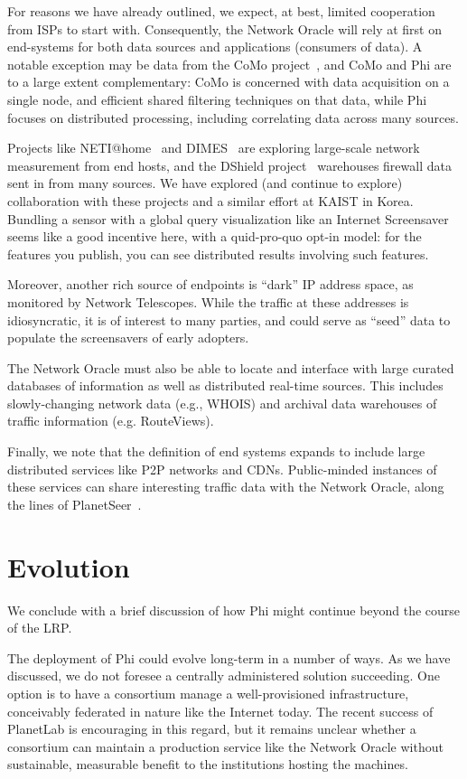 \documentclass[twocolumn,10pt]{article}
\def\Sys{Network Oracle\xspace}
\def\Lrp{Phi\xspace}
\begin{document}
For reasons we have already outlined, we expect, at best, limited
cooperation from ISPs to start with.  Consequently, the \Sys will rely
at first on end-systems for both data sources and applications
(consumers of data).  A notable exception may be data from the CoMo
project~\cite{como}, and CoMo and \Lrp are to a large extent
complementary: CoMo is concerned with data acquisition on a single
node, and efficient shared filtering techniques on that data, while
\Lrp focuses on distributed processing, including correlating data
across many sources. 

Projects like NETI@home~\cite{Simpson+:pam2004} and
DIMES~\cite{dimes:website} are exploring large-scale network
measurement from end hosts, and the DShield
project~\cite{dshield:website} warehouses firewall data sent in from
many sources.  We have explored (and continue to explore)
collaboration with these projects and a similar effort at KAIST in
Korea.  Bundling a sensor with a global query visualization
like an Internet Screensaver seems like a good incentive here, with a
quid-pro-quo opt-in model: for the features you publish, you can see
distributed results involving such features. 

Moreover, another rich source of endpoints is ``dark'' IP address
space, as monitored by Network Telescopes.  While the traffic at these
addresses is idiosyncratic, it is of interest to many parties, and
could serve as ``seed'' data to populate the screensavers of early
adopters.

The \Sys must also be able to locate and interface with large
curated databases of information as well as distributed real-time
sources.  This includes slowly-changing network data (e.g., WHOIS) and
archival data warehouses of traffic information (e.g. RouteViews).

Finally, we note that the definition of end systems expands 
to include large distributed services like P2P networks and CDNs. 
Public-minded instances of these services can share interesting
traffic data with the \Sys, along the lines of
PlanetSeer~\cite{planetseer}.  

\section{Evolution}

We conclude with a brief discussion of how \Lrp might continue beyond
the course of the LRP. 

The deployment of \Lrp could evolve long-term
in a number of ways.  As we have discussed, we do not foresee a
centrally administered solution succeeding.
One option is to have a consortium manage a
well-provisioned infrastructure, conceivably federated in nature like
the Internet today.  The recent success of PlanetLab is
encouraging in this regard, but it remains unclear whether a
consortium can maintain a production service like the \Sys without
sustainable, measurable benefit to the institutions hosting the
machines.
\end{document}
